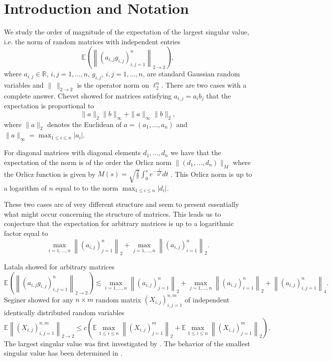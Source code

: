 \documentclass[12pt,a4paper]{article}
\newcommand{\Ex}{\mathbb{E}}
\newcommand{\norm}[1]{\left \lVert#1 \right\rVert}
\begin{document}
\section{Introduction and Notation}\label{intro} 
We study the order of magnitude of the expectation of the largest singular value, i.e. the norm of random matrices with independent entries 
$$
\Ex\left(\norm{(a_{i,j}g_{i,j})_{i,j=1}^n}_{2\rightarrow 2}\right),
$$
where $a_{i,j}\in\mathbb R$, $i,j=1,\dots,n$, $g_{i,j}$, $i,j=1,\dots,n$, are standard Gaussian random variables
and $\|\ \|_{2\to2}$ is the operator norm on $\ell_{2}^{n}$. There are two cases
with a complete answer. Chevet \cite{Che} showed for matrices satisfying
$a_{i,j}=a_{i}b_{j}$ that the expectation is 
proportional to  
$$
\|a\|_{2}\|b\|_{\infty}+\|a\|_{\infty}\|b\|_{2},
$$ 
where $\|a\|_{2}$ denotes the Euclidean of $a=(a_{1},\dots,a_{n})$ and
$\|a\|_{\infty}=\max_{1\leq i\leq n}|a_{i}|$.
\par
For diagonal matrices with diagonal elements
$d_{1},\dots,d_{n}$ we have
that the expectation of the norm is of the order the Orlicz norm
$\|(d_{1},\dots,d_{n})\|_{M}$ where the Orlicz function is given by
$M(s)=\sqrt{\frac{2}{\pi}}\int_{0}^{s}e^{-\frac{1}{2t^{2}}}dt$
\cite{GLSW1}. This Orlicz norm is up to a logarithm of $n$ equal to
to the norm $\max_{1\leq i\leq n}|d_{i}|$.
\par
These two cases are of very different structure and seem to present
essentially what might occur concerning the structure of matrices.
This leads us to conjecture that the expectation for arbitrary matrices is up to a logarithmic
factor equal to
\begin{equation}\label{TrivEst}
\max\limits_{i=1,...,n}\norm{(a_{i,j})_{j=1}^n}_{2}+\max\limits_{j=1,...,n}\norm{(a_{i,j})_{i=1}^n}_{2}.
\end{equation}
\par
Latala \cite{Lat} showed for arbitrary matrices
$$
\Ex\left(\norm{(a_{i,j}g_{i,j})_{i,j=1}^n}_{2\rightarrow 2}\right)\lesssim\max\limits_{i=1,...,n}\norm{(a_{i,j})_{j=1}^n}_{2}+\max\limits_{j=1,...,n}\norm{(a_{i,j})_{i=1}^n}_{2}+\norm{(a_{i,j})_{i,j=1}^n}_4.
$$
Seginer \cite{Seg} showed for any $n\times m$ random matrix $(X_{i,j})_{i,j=1}^{n,m}$
of independent identically distributed random variables
$$
\mathbb E\left\|(X_{i,j})_{i,j=1}^{n,m}\right\|_{2\to2}
\leq c\left(\mathbb E\max_{1\leq i\leq n}\left\|(X_{i,j})_{j=1}^{m}\right\|_{2}
+\mathbb E\max_{1\leq i\leq n}\left\|(X_{i,j})_{j=1}^{m}\right\|_{2}\right).
$$
The largest singular value was first investigated by \cite{Silv, YBK}.
The behavior of the smallest singular value has been determined
in \cite{AGLPT, RV,RV1}.
\vskip 3mm
\end{document}
